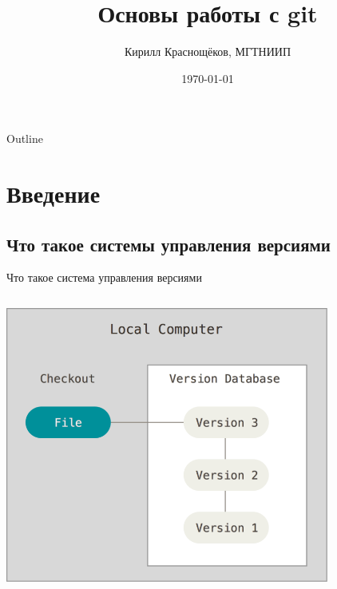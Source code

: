 \documentclass[presentation]{beamer}
\author[]{Кирилл Краснощёков, МГТНИИП}
\date{\today}
\title{Основы работы с git}
\begin{document}
\maketitle
\begin{frame}{Outline}
\tableofcontents
\end{frame}


\section{Введение}
\label{sec:org26726b7}
\subsection{Что такое системы управления версиями}
\label{sec:orgca2d789}
\begin{frame}[label={sec:org930d3d0}]{Что такое система управления версиями}
\begin{columns}
\begin{column}{0.65\columnwidth}
\begin{center}
\includegraphics[width=0.8\textwidth]{./01_vcs_00_what.png}
\end{center}
\end{column}


\end{columns}
\end{frame}
\end{document}
